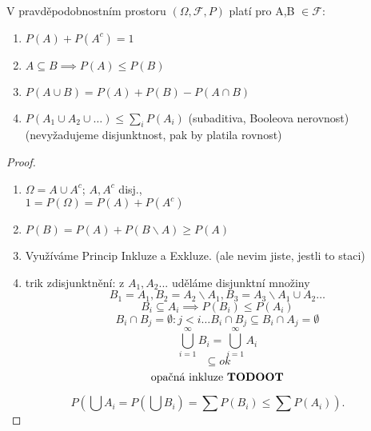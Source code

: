 \documentclass[../main.tex]{subfiles}
\begin{document}
\begin{theorem}
    V pravděpodobnostním prostoru $(\Omega, \mathcal{F}, P)$ platí pro A,B $\in \mathcal{F}$:
    \begin{enumerate}
        \item $P(A) + P(A^c) = 1$
        \item $A \subseteq B \implies P(A) \leq P(B)$
        \item $P(A\cup B) = P(A) + P(B) - P(A\cap B)$
        \item $P(A_1\cup A_2\cup \dots) \leq \sum_i P(A_i)$ (subaditiva, Booleova nerovnost)
         (nevyžadujeme disjunktnost, pak by platila rovnost)
    \end{enumerate}
\end{theorem}
\begin{proof}
    \begin{enumerate}
        \item $\Omega = A\cup A^c$; $A,A^c$ disj.,\\
        $1 = P(\Omega) = P(A) + P(A^c)$
        \item $P(B) = P(A) + P(B\backslash A) \geq P(A)$
        \item Využíváme Princip Inkluze a Exkluze. (ale nevim jiste, jestli to staci)
        \item trik zdisjunktnění: z $A_1,A_2...$ uděláme disjunktní množiny
         \[B_1 = A_1, B_2 = A_2 \backslash A_1, B_3 = A_3 \backslash A_1 \cup A_2 \dots\]
         \[B_i \subseteq A_i \implies P(B_i) \leq P(A_i)\]
         \[B_i \cap B_j = \emptyset : j < i \dots B_i \cap B_j \subseteq B_i \cap A_j = \emptyset\]
         \[\bigcup^\infty_{i=1}B_i = \bigcup^\infty_{i=1}A_i\]
         \[\subseteq ok\]
         \[\text{opačná inkluze \textbf{TODOOT}}\]
    \end{enumerate}
    \[P(\bigcup A_i = P(\bigcup B_i) = \sum P(B_i) \leq \sum P(A_i)).\]
\end{proof}
\end{document}

